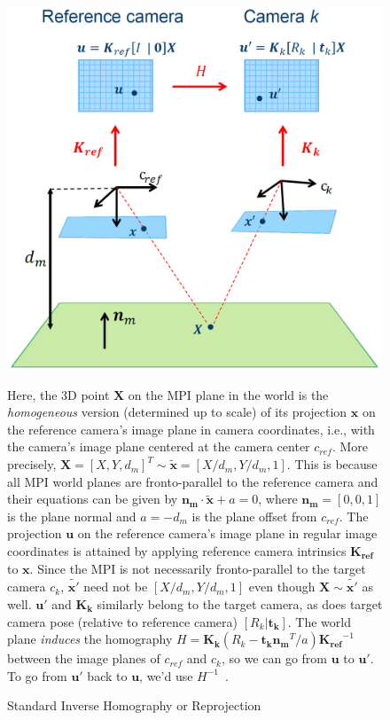 \begin{figure}[!h]
    \includegraphics[width=0.75\columnwidth]{figures/standard-inverse-homography.png}
    \caption{Standard Inverse Homography or Reprojection~\cite{brann_forelesninger_2016}}
    \label{fig:standard-inverse-homography}
    {\small Here, the 3D point $\boldsymbol{X}$ on the MPI plane in the world is the \textit{homogeneous} version (determined up to scale) of its projection $\boldsymbol{x}$ on the reference camera's image plane in camera coordinates, i.e., with the camera's image plane centered at the camera center $c_{ref}$. More precisely, $\boldsymbol{X} = [X,Y,d_m]^T \sim \boldsymbol{\tilde{x}} = [X/d_m,Y/d_m,1]$. This is because all MPI world planes are fronto-parallel to the reference camera and their equations can be given by $\boldsymbol{n_m \cdot \tilde{x}} + a = 0$, where $\boldsymbol{n_m} = [0,0,1]$ is the plane normal and $a = -d_m$ is the plane offset from $c_{ref}$. The projection $\boldsymbol{u}$ on the reference camera's image plane in regular image coordinates is attained by applying reference camera intrinsics $\boldsymbol{K_{ref}}$ to $\boldsymbol{x}$. Since the MPI is not necessarily fronto-parallel to the target camera $c_k$, $\boldsymbol{\tilde{x'}}$ need not be $[X/d_m,Y/d_m,1]$ even though $\boldsymbol{X} \sim \boldsymbol{\tilde{x'}}$ as well. $\boldsymbol{u'}$ and $\boldsymbol{K_k}$ similarly belong to the target camera, as does target camera pose (relative to reference camera) $[R_k|\boldsymbol{t_k}]$. The world plane \textit{induces} the homography $H = \boldsymbol{K_k} (R_k - \boldsymbol{t_k} \boldsymbol{n_m}^T / a) \boldsymbol{K_{ref}}^{-1}$ between the image planes of $c_{ref}$ and $c_k$, so we can go from $\boldsymbol{u}$ to $\boldsymbol{u'}$. To go from $\boldsymbol{u'}$ back to $\boldsymbol{u}$, we'd use $H^{-1}$~\cite{zikuicai_derivation_2019}.}
\end{figure}

